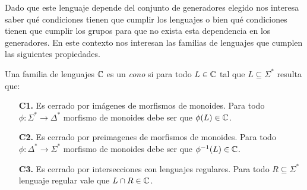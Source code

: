 \documentclass[tesis.tex]{subfiles}
\begin{document}
Dado que este lenguaje depende del conjunto de generadores elegido nos interesa saber qué condiciones tienen que cumplir los lenguajes o bien qué condiciones tienen que cumplir los grupos para que no exista esta dependencia en los generadores.
En este contexto nos interesan las familias de lenguajes que cumplen las siguientes propiedades.
\medskip
\begin{deff}
	Una familia de lenguajes $\mathbb{C}$ es un \emph{cono} si para todo $L \in \mathbb{C}$ tal que $L \subseteq \Sigma^*$ resulta que:
	\begin{itemize}
		\item[\textbf{C1.}] Es cerrado por imágenes de morfismos de monoides. 
		Para todo $\phi:\Sigma^* \to \Delta^*$ morfismo de monoides debe ser que $\phi(L) \in \mathbb{C}$.
		\item[\textbf{C2.}] Es cerrado por preimagenes de morfismos de monoides. 
		Para todo $\phi:\Delta^* \to \Sigma^*$ morfismo de monoides  debe ser que $\phi^{-1}(L) \in \mathbb{C}$. 
		\item[\textbf{C3.}] Es cerrado por intersecciones con lenguajes regulares. 
		Para todo $R \subseteq \Sigma^*$ lenguaje regular vale que $L \cap R \in \mathbb{C}$.
	\end{itemize}
\end{deff} 
\end{document}
